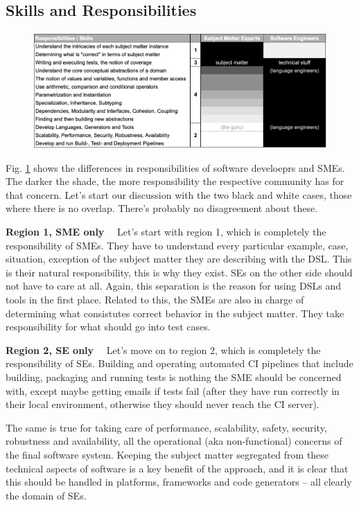 \documentclass[runningheads]{llncs}
\newcommand\parhead[1]{\vspace{1mm}\noindent\textbf{{#1}}\ \ }
\newcommand{\fig}[1]{Fig. \ref{#1}}  %
\begin{document}
\subsection{Skills and Responsibilities}

\begin{figure}
\begin{center}
    \includegraphics[width=1\columnwidth]{figures/table-respo.png}
    \caption{}
    \label{table-respo}
\end{center} 
\end{figure} 

\fig{table-respo} shows the differences in responsibilities of software
develoeprs and SMEs. The darker the shade, the more responsibility the
respective community has for that concern. Let's start our discussion
with the two black and white cases, those where there is no overlap.
There's probably no disagreement about these.

\parhead{Region 1, SME only} Let's start with region 1, which is completely the
responsibility of SMEs. They have to understand every particular example, case,
situation, exception of the subject matter they are describing with the DSL.
This is their natural responsibility, this is why they exist. SEs on the other
side should not have to care at all. Again, this separation is the reason for
using DSLs and tools in the first place. Related to this, the SMEs are also in
charge of determining what consistutes correct behavior in the subject matter.
They take responsibility for what should go into test cases.

\parhead{Region 2, SE only} Let's move on to region 2, which is completely the
responsibility of SEs.
Building and operating automated CI pipelines that include building, packaging
and running tests is nothing the SME should be concerned with, except maybe
getting emails if tests fail (after they have run correctly in their local
environment, otherwise they should never reach the CI server).
 
The same is true for taking care of performance, scalability, 
safety, security, robustness and availability, all the operational
(aka non-functional) concerns of the final software system. Keeping the
subject matter segregated from these technical aspects of software is
a key benefit of the approach, and it is clear that this should be 
handled in platforms, frameworks and code generators -- all clearly
the domain of SEs.
\end{document}
